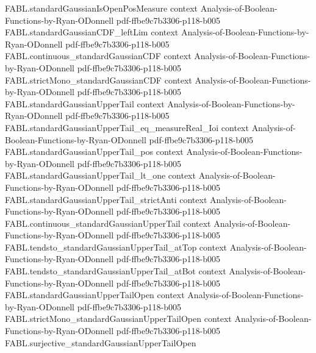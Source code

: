 \begin{theorem}
\label{FABL.gaussianIsoperimetric_isEquivalent_atBot}
\leanok
{}
\proofstep
  {FABL.standardGaussianIsOpenPosMeasure}
  {context}
  {Analysis-of-Boolean-Functions-by-Ryan-ODonnell}
  {pdf-ffbe9c7b3306-p118-b005}
\proofstep
  {FABL.standardGaussianCDF_leftLim}
  {context}
  {Analysis-of-Boolean-Functions-by-Ryan-ODonnell}
  {pdf-ffbe9c7b3306-p118-b005}
\proofstep
  {FABL.continuous_standardGaussianCDF}
  {context}
  {Analysis-of-Boolean-Functions-by-Ryan-ODonnell}
  {pdf-ffbe9c7b3306-p118-b005}
\proofstep
  {FABL.strictMono_standardGaussianCDF}
  {context}
  {Analysis-of-Boolean-Functions-by-Ryan-ODonnell}
  {pdf-ffbe9c7b3306-p118-b005}
\proofstep
  {FABL.standardGaussianUpperTail}
  {context}
  {Analysis-of-Boolean-Functions-by-Ryan-ODonnell}
  {pdf-ffbe9c7b3306-p118-b005}
\proofstep
  {FABL.standardGaussianUpperTail_eq_measureReal_Ioi}
  {context}
  {Analysis-of-Boolean-Functions-by-Ryan-ODonnell}
  {pdf-ffbe9c7b3306-p118-b005}
\proofstep
  {FABL.standardGaussianUpperTail_pos}
  {context}
  {Analysis-of-Boolean-Functions-by-Ryan-ODonnell}
  {pdf-ffbe9c7b3306-p118-b005}
\proofstep
  {FABL.standardGaussianUpperTail_lt_one}
  {context}
  {Analysis-of-Boolean-Functions-by-Ryan-ODonnell}
  {pdf-ffbe9c7b3306-p118-b005}
\proofstep
  {FABL.standardGaussianUpperTail_strictAnti}
  {context}
  {Analysis-of-Boolean-Functions-by-Ryan-ODonnell}
  {pdf-ffbe9c7b3306-p118-b005}
\proofstep
  {FABL.continuous_standardGaussianUpperTail}
  {context}
  {Analysis-of-Boolean-Functions-by-Ryan-ODonnell}
  {pdf-ffbe9c7b3306-p118-b005}
\proofstep
  {FABL.tendsto_standardGaussianUpperTail_atTop}
  {context}
  {Analysis-of-Boolean-Functions-by-Ryan-ODonnell}
  {pdf-ffbe9c7b3306-p118-b005}
\proofstep
  {FABL.tendsto_standardGaussianUpperTail_atBot}
  {context}
  {Analysis-of-Boolean-Functions-by-Ryan-ODonnell}
  {pdf-ffbe9c7b3306-p118-b005}
\proofstep
  {FABL.standardGaussianUpperTailOpen}
  {context}
  {Analysis-of-Boolean-Functions-by-Ryan-ODonnell}
  {pdf-ffbe9c7b3306-p118-b005}
\proofstep
  {FABL.strictMono_standardGaussianUpperTailOpen}
  {context}
  {Analysis-of-Boolean-Functions-by-Ryan-ODonnell}
  {pdf-ffbe9c7b3306-p118-b005}
\proofstep
  {FABL.surjective_standardGaussianUpperTailOpen}

\end{theorem}
